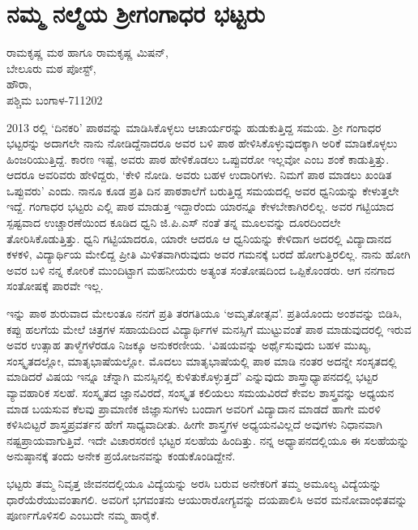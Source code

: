 \chapter{ನಮ್ಮ ನಲ್ಮೆಯ ಶ್ರೀಗಂಗಾಧರ ಭಟ್ಟರು}

\begin{center}
\smallskip

ರಾಮಕೃಷ್ಣ ಮಠ ಹಾಗೂ ರಾಮಕೃಷ್ಣ ಮಿಷನ್,\\
ಬೇಲೂರು ಮಠ ಪೋಸ್ಟ್,\\
ಹೌರಾ,\\ 
ಪಶ್ಚಿಮ ಬಂಗಾಳ-711202
\end{center}

2013 ರಲ್ಲಿ `ದಿನಕರಿ' ಪಾಠವನ್ನು ಮಾಡಿಸಿಕೊಳ್ಳಲು ಆಚಾರ್ಯರನ್ನು ಹುಡುಕುತ್ತಿದ್ದ ಸಮಯ. ಶ್ರೀ ಗಂಗಾಧರ ಭಟ್ಟರನ್ನು ಅದಾಗಲೇ ನಾನು ನೋಡಿದ್ದೆನಾದರೂ ಅವರ ಬಳಿ ಪಾಠ ಹೇಳಿಸಿಕೊಳ್ಳುವುದಕ್ಕಾಗಿ ಅರಿಕೆ ಮಾಡಿಕೊಳ್ಳಲು ಹಿಂಜರಿಯುತ್ತಿದ್ದೆ. ಕಾರಣ ಇಷ್ಟೆ, ಅವರು ಪಾಠ ಹೇಳಿಕೊಡಲು ಒಪ್ಪುವರೋ ಇಲ್ಲವೋ ಎಂಬ ಶಂಕೆ ಕಾಡುತ್ತಿತ್ತು. ಆದರೂ ಅವರಿವರು ಹೇಳಿದ್ದರು, `ಕೇಳಿ ನೋಡಿ. ಅವರು ಬಹಳ ಉದಾರಿಗಳು. ನಿಮಗೆ ಪಾಠ ಮಾಡಲು ಖಂಡಿತ ಒಪ್ಪುವರು' ಎಂದು. ನಾನೂ ಕೂಡ ಪ್ರತಿ ದಿನ ಪಾಠಶಾಲೆಗೆ ಬರುತ್ತಿದ್ದ ಸಮಯದಲ್ಲಿ ಅವರ ಧ್ವನಿಯನ್ನು ಕೇಳುತ್ತಲೇ ಇದ್ದೆ. ಗಂಗಾಧರ ಭಟ್ಟರು ಎಲ್ಲಿ ಪಾಠ ಮಾಡುತ್ತ ಇದ್ದಾರೆಂದು ಯಾರನ್ನೂ ಕೇಳಬೇಕಾಗಿರಲಿಲ್ಲ. ಅವರ ಗಟ್ಟಿಯಾದ ಸ್ಪಷ್ಟವಾದ ಉಚ್ಚಾರಣೆಯಿಂದ ಕೂಡಿದ ಧ್ವನಿ ಜಿ.ಪಿ.ಎಸ್ ನಂತೆ ತನ್ನ ಮೂಲವನ್ನು ದೂರದಿಂದಲೇ ತೋರಿಸಿಕೊಡುತ್ತಿತ್ತು. ಧ್ವನಿ ಗಟ್ಟಿಯಾದರೂ, ಯಾರೇ ಆದರೂ ಆ ಧ್ವನಿಯನ್ನು ಕೇಳಿದಾಗ ಅದರಲ್ಲಿ ವಿದ್ಯಾದಾನದ ಕಳಕಳಿ, ವಿದ್ಯಾರ್ಥಿಯ ಮೇಲಿದ್ದ ಪ್ರೀತಿ ಮಿಳಿತವಾಗಿರುವುದು ಅವರ  ಗಮನಕ್ಕೆ ಬರದೆ ಹೋಗುತ್ತಿರಲಿಲ್ಲ. ನಾನು ಹೋಗಿ ಅವರ ಬಳಿ ನನ್ನ ಕೋರಿಕೆ ಮುಂದಿಟ್ಟಾಗ ಮಹನೀಯರು ಅತ್ಯಂತ ಸಂತೋಷದಿಂದ ಒಪ್ಪಿಕೊಂಡರು. ಆಗ ನನಗಾದ ಸಂತೋಷಕ್ಕೆ ಪಾರವೇ ಇಲ್ಲ. 

ಇನ್ನು ಪಾಠ ಶುರುವಾದ ಮೇಲಂತೂ ನನಗೆ ಪ್ರತಿ ತರಗತಿಯೂ `ಅಮೃತೋತ್ಸವ'. ಪ್ರತಿಯೊಂದು ಅಂಶವನ್ನು ಬಿಡಿಸಿ, ಕಪ್ಪು ಹಲಗೆಯ ಮೇಲೆ ಚಿತ್ರಗಳ ಸಹಾಯದಿಂದ ವಿದ್ಯಾರ್ಥಿಗಳ ಮನಸ್ಸಿಗೆ ಮುಟ್ಟುವಂತೆ ಪಾಠ ಮಾಡುವುದರಲ್ಲಿ ಇರುವ ಅವರ ಉತ್ಸಾಹ ತಾಳ್ಮೆಗಳೆರಡೂ ನಿಜಕ್ಕೂ ಅನುಕರಣೀಯ.  `ವಿಷಯವನ್ನು ಅರ್ಥೈಸುವುದು ಬಹಳ ಮುಖ್ಯ, ಸಂಸ್ಕೃತದಲ್ಲೋ, ಮಾತೃಭಾಷೆಯಲ್ಲೋ. ಮೊದಲು ಮಾತೃಭಾಷೆಯಲ್ಲಿ ಪಾಠ ಮಾಡಿ ನಂತರ ಅದನ್ನೇ ಸಂಸೃತದಲ್ಲಿ ಮಾಡಿದರೆ ವಿಷಯ ಇನ್ನೂ ಚೆನ್ನಾಗಿ ಮನಸ್ಸಿನಲ್ಲಿ ಕುಳಿತುಕೊಳ್ಳುತ್ತದೆ' ಎನ್ನುವುದು ಶಾಸ್ತ್ರಾಧ್ಯಾಪನದಲ್ಲಿ ಭಟ್ಟರ ವ್ಯಾವಹಾರಿಕ ಸಲಹೆ. ಸಂಸ್ಕೃತದ ಜ್ಞಾನವಿರದೆ, ಸಂಸ್ಕೃತ ಕಲಿಯಲು ಸಮಯವಿರದೆ  ಕೇವಲ ಶಾಸ್ತ್ರವನ್ನು ಅಧ್ಯಯನ ಮಾಡ ಬಯಸುವ ಕೆಲವು ಪ್ರಾಮಾಣಿಕ ಜಿಜ್ಞಾಸುಗಳು ಬಂದಾಗ ಅವರಿಗೆ ವಿದ್ಯಾದಾನ ಮಾಡದೆ ಹಾಗೇ ಮರಳಿ ಕಳಿಸಿಬಿಟ್ಟರೆ ಶಾಸ್ತ್ರಪ್ರವರ್ತನ ಹೇಗೆ ಸಾಧ್ಯವಾದೀತು. ಹೀಗೇ ಶಾಸ್ತ್ರಗಳ ಅಧ್ಯಯನವಿಲ್ಲದೆ ಅವುಗಳು ನಿಧಾನವಾಗಿ ನಷ್ಟಪ್ರಾಯವಾಗುತ್ತಿವೆ. ಇದೇ ವಿಚಾರಸರಣಿ ಭಟ್ಟರ ಸಲಹೆಯ ಹಿಂದಿತ್ತು. ನನ್ನ ಅಧ್ಯಾಪನದಲ್ಲಿಯೂ ಈ ಸಲಹೆಯನ್ನು ಅನುಷ್ಠಾನಕ್ಕೆ ತಂದು ಅನೇಕ ಪ್ರಯೋಜನವನ್ನು ಕಂಡುಕೊಂಡಿದ್ದೇನೆ. 

ಭಟ್ಟರು ತಮ್ಮ ನಿವೃತ್ತ ಜೀವನದಲ್ಲಿಯೂ ವಿದ್ಯೆಯನ್ನು ಅರಸಿ ಬರುವ ಅನೇಕರಿಗೆ ತಮ್ಮ ಅಮೂಲ್ಯ ವಿದ್ಯೆಯನ್ನು ಧಾರೆಯೆರೆಯುವಂತಾಗಲಿ. ಅವರಿಗೆ ಭಗವಂತನು ಆಯುರಾರೋಗ್ಯವನ್ನು ದಯಪಾಲಿಸಿ ಅವರ ಮನೋವಾಂಛಿತವನ್ನು ಪೂರ್ಣಗೊಳಿಸಲಿ ಎಂಬುದೇ ನಮ್ಮ ಹಾರೈಕೆ.

